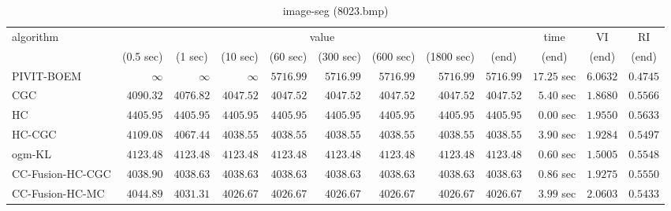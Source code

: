 \begin{table}[H]
\scriptsize
\centering
\caption{image-seg (8023.bmp)}
\label{tab:anytimetable-image-seg-8023.bmp}
\begin{tabular}{lrrrrrrrrrrr}
\toprule
           algorithm &                                   \multicolumn{8}{c}{value} & \multicolumn{1}{c}{time}    & \multicolumn{1}{c}{VI}  & \multicolumn{1}{c}{RI} \\  
\cmidrule(lr){2-9}\cmidrule(lr){10-10} \cmidrule(lr){11-11} \cmidrule(lr){12-12}   
                     & \multicolumn{1}{c}{(0.5 sec)} & \multicolumn{1}{c}{(1 sec)} & \multicolumn{1}{c}{(10 sec)} & \multicolumn{1}{c}{(60 sec)} & \multicolumn{1}{c}{(300 sec)} & \multicolumn{1}{c}{(600 sec)} & \multicolumn{1}{c}{(1800 sec)} & \multicolumn{1}{c}{(end)} & \multicolumn{1}{c}{(end)}    & \multicolumn{1}{c}{(end)}   & \multicolumn{1}{c}{(end)}  \\ \midrule 
          PIVIT-BOEM & $\infty$ & $\infty$ & $\infty$ & $      5716.99$ & $      5716.99$ & $      5716.99$ & $      5716.99$ & $      5716.99$ & $        17.25$ sec    & $       6.0632$  & $       0.4745$ \\ 
                 CGC & $      4090.32$ & $      4076.82$ & $      4047.52$ & $      4047.52$ & $      4047.52$ & $      4047.52$ & $      4047.52$ & $      4047.52$ & $         5.40$ sec    & $       1.8680$  & $       0.5566$ \\ 
                  HC & $      4405.95$ & $      4405.95$ & $      4405.95$ & $      4405.95$ & $      4405.95$ & $      4405.95$ & $      4405.95$ & $      4405.95$ & $         0.00$ sec    & $       1.9550$  & $       0.5633$ \\ 
              HC-CGC & $      4109.08$ & $      4067.44$ & $      4038.55$ & $      4038.55$ & $      4038.55$ & $      4038.55$ & $      4038.55$ & $      4038.55$ & $         3.90$ sec    & $       1.9284$  & $       0.5497$ \\ 
              ogm-KL & $      4123.48$ & $      4123.48$ & $      4123.48$ & $      4123.48$ & $      4123.48$ & $      4123.48$ & $      4123.48$ & $      4123.48$ & $         0.60$ sec    & $       1.5005$  & $       0.5548$ \\ 
    CC-Fusion-HC-CGC & $      4038.90$ & $      4038.63$ & $      4038.63$ & $      4038.63$ & $      4038.63$ & $      4038.63$ & $      4038.63$ & $      4038.63$ & $         0.86$ sec    & $       1.9275$  & $       0.5550$ \\ 
     CC-Fusion-HC-MC & $      4044.89$ & $      4031.31$ & $      4026.67$ & $      4026.67$ & $      4026.67$ & $      4026.67$ & $      4026.67$ & $      4026.67$ & $         3.99$ sec    & $       2.0603$  & $       0.5433$ \\ 

\end{tabular}
\end{table}
